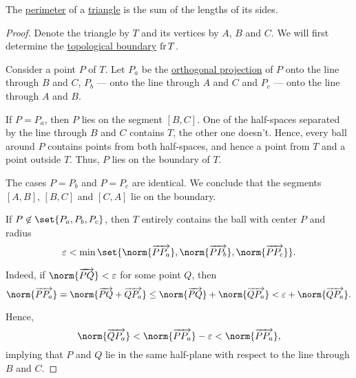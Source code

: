 \begin{proposition}\label{thm:perimeter_of_triangle}
  The \hyperref[def:perimeter]{perimeter} of a \hyperref[def:triangle]{triangle} is the sum of the lengths of its sides.
\end{proposition}
\begin{proof}
  Denote the triangle by \( T \) and its vertices by \( A \), \( B \) and \( C \). We will first determine the \hyperref[def:topological_boundary_operator]{topological boundary} \( \operatorname{fr} T \).

  Consider a point \( P \) of \( T \). Let \( P_a \) be the \hyperref[def:orthogonal_projection]{orthogonal projection} of \( P \) onto the line through \( B \) and \( C \), \( P_b \) --- onto the line through \( A \) and \( C \) and \( P_c \) --- onto the line through \( A \) and \( B \).

  If \( P = P_a \), then \( P \) lies on the segment \( [B, C] \). One of the half-spaces separated by the line through \( B \) and \( C \) contains \( T \), the other one doesn't. Hence, every ball around \( P \) contains points from both half-spaces, and hence a point from \( T \) and a point outside \( T \). Thus, \( P \) lies on the boundary of \( T \).

  The cases \( P = P_b \) and \( P = P_c \) are identical. We conclude that the segments \( [A, B] \), \( [B, C] \) and \( [C, A] \) lie on the boundary.

  If \( P \not\in \set{ P_a, P_b, P_c } \), then \( T \) entirely contains the ball with center \( P \) and radius
  \begin{equation*}
    \varepsilon < \min\set{ \norm{\vect{P P_a}}, \norm{\vect{P P_b}}, \norm{\vect{P P_c}} }.
  \end{equation*}

  Indeed, if \( \norm{\vect{PQ}} < \varepsilon \) for some point \( Q \), then
  \begin{equation*}
    \norm{\vect{P P_a}}
    =
    \norm{\vect{P Q} + \vect{Q P_a}}
    \leq
    \norm{\vect{P Q}} + \norm{\vect{Q P_a}}
    <
    \varepsilon + \norm{\vect{Q P_a}}.
  \end{equation*}

  Hence,
  \begin{equation*}
    \norm{\vect{Q P_a}} < \norm{\vect{P P_a}} - \varepsilon < \norm{\vect{P P_a}},
  \end{equation*}
  implying that \( P \) and \( Q \) lie in the same half-plane with respect to the line through \( B \) and \( C \).


\end{proof}
